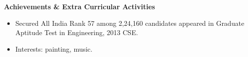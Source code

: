 \documentclass[a4paper,11pt]{article}
\newcommand{\resheading}[1]{{\small \colorbox{mygrey}{\begin{minipage}{0.975\textwidth}{\textbf{#1 \vphantom{p\^{E}}}}\end{minipage}}}}
\begin{document}
%
%	
%	
%		
%	
%		
%	
%	
%	


\resheading{\textbf{\large Achievements \& Extra Curricular Activities }}

\begin{description}
\item
\begin{itemize}
	\item Secured All India Rank 57 among 2,24,160 candidates appeared in Graduate Aptitude Test in
Engineering, 2013 CSE.
\end{itemize}
\item
\begin{itemize}
\item Interests: painting, music.
\end{itemize}
\end{description}
\end{document}

